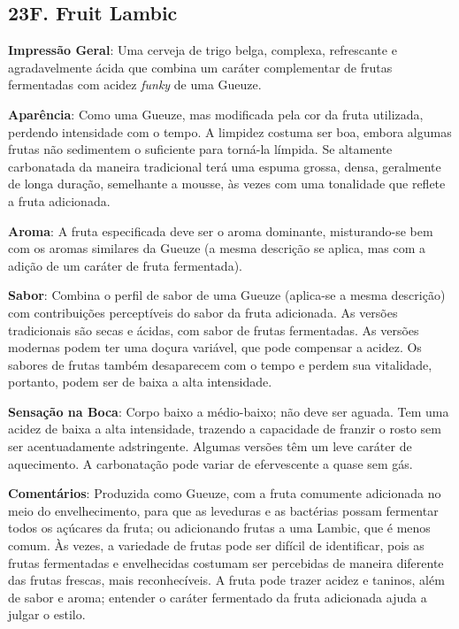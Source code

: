 \subsection*{23F. Fruit Lambic}

\textbf{Impressão Geral}: Uma cerveja de trigo belga, complexa, refrescante e agradavelmente ácida que combina um caráter complementar de frutas fermentadas com acidez \textit{funky} de uma Gueuze.

\textbf{Aparência}: Como uma Gueuze, mas modificada pela cor da fruta utilizada, perdendo intensidade com o tempo. A limpidez costuma ser boa, embora algumas frutas não sedimentem o suficiente para torná-la límpida. Se altamente carbonatada da maneira tradicional terá uma espuma grossa, densa, geralmente de longa duração, semelhante a mousse, às vezes com uma tonalidade que reflete a fruta adicionada.

\textbf{Aroma}: A fruta especificada deve ser o aroma dominante, misturando-se bem com os aromas similares da Gueuze (a mesma descrição se aplica, mas com a adição de um caráter de fruta fermentada).

\textbf{Sabor}: Combina o perfil de sabor de uma Gueuze (aplica-se a mesma descrição) com contribuições perceptíveis do sabor da fruta adicionada. As versões tradicionais são secas e ácidas, com sabor de frutas fermentadas. As versões modernas podem ter uma doçura variável, que pode compensar a acidez. Os sabores de frutas também desaparecem com o tempo e perdem sua vitalidade, portanto, podem ser de baixa a alta intensidade.

\textbf{Sensação na Boca}: Corpo baixo a médio-baixo; não deve ser aguada. Tem uma acidez de baixa a alta intensidade, trazendo a capacidade de franzir o rosto sem ser acentuadamente adstringente. Algumas versões têm um leve caráter de aquecimento. A carbonatação pode variar de efervescente a quase sem gás.

\textbf{Comentários}: Produzida como Gueuze, com a fruta comumente adicionada no meio do envelhecimento, para que as leveduras e as bactérias possam fermentar todos os açúcares da fruta; ou adicionando frutas a uma Lambic, que é menos comum. Às vezes, a variedade de frutas pode ser difícil de identificar, pois as frutas fermentadas e envelhecidas costumam ser percebidas de maneira diferente das frutas frescas, mais reconhecíveis. A fruta pode trazer acidez e taninos, além de sabor e aroma; entender o caráter fermentado da fruta adicionada ajuda a julgar o estilo.

